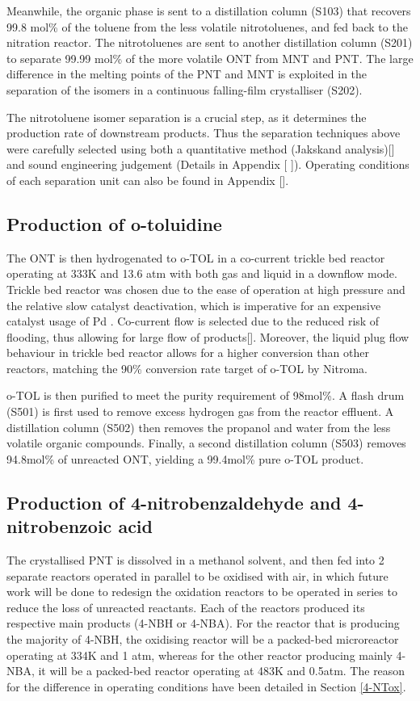 Meanwhile, the organic phase is sent to a distillation column (S103) that recovers 99.8 mol\% of the toluene from the less volatile nitrotoluenes, and fed back to the nitration reactor. The nitrotoluenes are sent to another distillation column (S201) to separate 99.99 mol\% of the more volatile ONT from MNT and PNT. The large difference in the melting points of the PNT and MNT is exploited in the separation of the isomers in a continuous falling-film crystalliser (S202). 

The nitrotoluene isomer separation is a crucial step, as it determines the production rate of downstream products. Thus the separation techniques above were carefully selected using both a quantitative method (Jakskand analysis)[] and sound engineering judgement (Details in Appendix [ ]). Operating conditions of each separation unit can also be found in Appendix []. 

\subsection{Production of o-toluidine}
The ONT is then hydrogenated to o-TOL in a co-current trickle bed reactor operating at 333K and 13.6 atm with both gas and liquid in a downflow mode. Trickle bed reactor was chosen due to the ease of operation at high pressure and the relative slow catalyst deactivation, which is imperative for an expensive catalyst usage of Pd \cite{vemala_hydrodynamic_nodate}. Co-current flow is selected due to the reduced risk of flooding, thus allowing for large flow of products[]. Moreover, the liquid plug flow behaviour in trickle bed reactor allows for a higher conversion than other reactors, matching the 90\% conversion rate target of o-TOL by Nitroma. 

o-TOL is then purified to meet the purity requirement of 98mol\%. A flash drum (S501) is first used to remove excess hydrogen gas from the reactor effluent. A distillation column (S502) then removes the propanol and water from the less volatile organic compounds. Finally, a second distillation column (S503) removes 94.8mol\% of unreacted ONT, yielding a 99.4mol\% pure o-TOL product.
 
\subsection{Production of 4-nitrobenzaldehyde and 4-nitrobenzoic acid}
The crystallised PNT is dissolved in a methanol solvent, and then fed into 2 separate reactors operated in parallel to be oxidised with air, in which future work will be done to redesign the oxidation reactors to be operated in series to reduce the loss of unreacted reactants. Each of the reactors produced its respective main products (4-NBH or 4-NBA). For the reactor that is producing the majority of 4-NBH, the oxidising reactor will be a packed-bed microreactor operating at 334K and 1 atm, whereas for the other reactor producing mainly 4-NBA, it will be a packed-bed reactor operating at 483K and 0.5atm. The reason for the difference in operating conditions have been detailed in Section \ref{4-NTox}.

